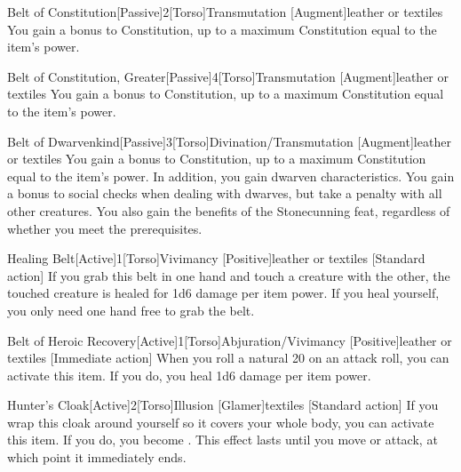         \begin{magicitemdef}{Belt of Constitution}[Passive]{2}[Torso]{Transmutation [Augment]}{leather or textiles}
             You gain a  bonus to Constitution, up to a maximum Constitution equal to the item's power.
        \end{magicitemdef}

        \begin{magicitemdef}{Belt of Constitution, Greater}[Passive]{4}[Torso]{Transmutation [Augment]}{leather or textiles}
             You gain a  bonus to Constitution, up to a maximum Constitution equal to the item's power.
        \end{magicitemdef}

        \begin{magicitemdef}{Belt of Dwarvenkind}[Passive]{3}[Torso]{Divination/Transmutation [Augment]}{leather or textiles}
             You gain a  bonus to Constitution, up to a maximum Constitution equal to the item's power.
            In addition, you gain dwarven characteristics.
            You gain a  bonus to social checks when dealing with dwarves, but take a  penalty with all other creatures.
            You also gain the benefits of the Stonecunning feat, regardless of whether you meet the prerequisites.
        \end{magicitemdef}

        \begin{magicitemdef}{Healing Belt}[Active]{1}[Torso]{Vivimancy [Positive]}{leather or textiles}
            [Standard action] If you grab this belt in one hand and touch a creature with the other, the touched creature is healed for 1d6 damage per item power.
            If you heal yourself, you only need one hand free to grab the belt.
        \end{magicitemdef}

        \begin{magicitemdef}{Belt of Heroic Recovery}[Active]{1}[Torso]{Abjuration/Vivimancy [Positive]}{leather or textiles}
            [Immediate action] When you roll a natural 20 on an attack roll, you can activate this item. If you do, you heal 1d6 damage per item power.
        \end{magicitemdef}

        \begin{magicitemdef}{Hunter's Cloak}[Active]{2}[Torso]{Illusion [Glamer]}{textiles}
            [Standard action] If you wrap this cloak around yourself so it covers your whole body, you can activate this item.
            If you do, you become .
            This effect lasts until you move or attack, at which point it immediately ends.
        \end{magicitemdef}

